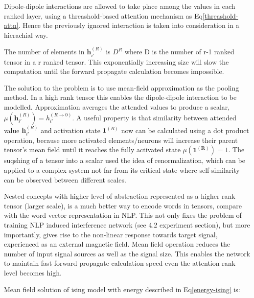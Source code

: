 \documentclass[11pt,a4paper]{article}
\begin{document}
\begin{multicols}{2}
  Dipole-dipole interactions are allowed to take place among the values in each ranked layer, using a threashold-based attention mechanism as Eq\ref{threashold-attn}. 
  Hence the previously ignored interaction is taken into consideration in a hierachial way. 

  The number of elements in $\boldsymbol{h}_{i'}^{(R)}$ is $D^R$ where D is the number of r-1 ranked tensor in a r ranked tensor. This exponentially increasing size will slow the computation until the forward propagate calculation becomes impossible. 

  The solution to the problem is to use mean-field approximation as the pooling method. In a high rank tensor this enables the dipole-dipole interaction to be modelled. 
  Approximation averages the attended values to produce a scalar, $\mu(\boldsymbol{h}_{i'}^{(R)}) = h_{i'}^{(R \rightarrow 0)}$. A useful property is that similarity between attended value $\boldsymbol{h}_{i'}^{(R)}$ and activation state $\boldsymbol{1}^{(R)}$ now can be calculated using a dot product operation, 
  because more activated elements/neurons will increase their parent tensor's mean field until it reaches the fully activated state $\mu(\boldsymbol{1^{(R)}})=1$. 
  The suqshing of a tensor into a scalar used the idea of renormalization, which can be applied to a complex system not far from its critical state where self-similarity can be observed between different scales.

  Nested concepts with higher level of abstraction represented as a higher rank tensor (larger scale), is a much better way to encode words in tensors, compare with the word vector representation in NLP. 
  This not only fixes the problem of training NLP induced interference network (see 4.2 experiment section), but more importantly, gives rise to the non-linear response towards target signal, experienced as an external magnetic field. 
  Mean field operation reduces the number of input signal sources as well as the signal size. This enables the network to maintain fast forward propagate calculation speed even the attention rank level becomes high.

  Mean field solution of ising model with energy described in Eq\eqref{energy-ising} is:


\end{multicols}
\end{document}
